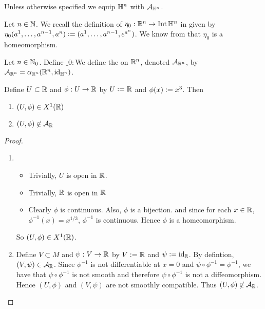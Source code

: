 \documentclass{book}
\begin{document}
	\begin{note}
		Unless otherwise specified we equip $\mathbb{H}^n$ with $\mathcal{A}_{\mathbb{H}^n}$.
	\end{note}

	\begin{note}
		Let $n \in \mathbb{N}$. We recall the definition of $\eta_0: \mathbb{R}^n \rightarrow \operatorname{Int} \mathbb{H}^n$ in  given by $\eta_0(a^1, \ldots, a^{n-1}, a^n) \vcentcolon= (a^1, \ldots, a^{n-1}, e^{a^n})$. We know from  that
		$\eta_0$ is a homeomorphism. 
	\end{note}

	\begin{defn}
		Let $n \in \mathbb{N}_0$. Define $\_0: $We define the  on $\mathbb{R}^n$, denoted $\mathcal{A}_{\mathbb{R}^n}$, by $\mathcal{A}_{\mathbb{R}^n} = \alpha_{\mathbb{R}^n}(\mathbb{R}^n, \operatorname{id}_{\mathbb{H}^n})$.  
	\end{defn}

	\begin{ex} 
		Define $U \subset \mathbb{R}$ and $\phi: U \rightarrow \mathbb{R}$ by $U \vcentcolon= \mathbb{R}$ and $\phi(x) \vcentcolon= x^3$. Then 
		\begin{enumerate}
			\item $(U, \phi) \in X^1(\mathbb{R})$ 
			\item $(U, \phi) \not \in \mathcal{A}_{\mathbb{R}}$
		\end{enumerate}
	\end{ex}

	\begin{proof}\
		\begin{enumerate}
			\item
			\begin{itemize}
				\item Trivially, $U$ is open in $\mathbb{R}$.
				\item Trivially, $\mathbb{R}$ is open in $\mathbb{R}$
				\item  Clearly $\phi$ is continuous. Also, $\phi$ is a bijection. and since for each $x \in \mathbb{R}$, $\phi^{-1}(x) = x^{1/3}$, $\phi^{-1}$ is continuous. Hence $\phi$ is a homeomorphism. 
			\end{itemize}
			So $(U, \phi) \in X^1(\mathbb{R})$.
			\item Define $V \subset M$ and $\psi: V \rightarrow \mathbb{R}$ by $V \vcentcolon= \mathbb{R}$ and $\psi \vcentcolon= \operatorname{id}_{\mathbb{R}}$. By defintion, $(V, \psi) \in \mathcal{A}_{\mathbb{R}}$. Since $\phi^{-1}$ is not differentiable at $x=0$ and $\psi \circ \phi^{-1} = \phi^{-1}$, we have that $\psi \circ \phi^{-1}$ is not smooth and therefore $\psi \circ \phi^{-1}$ is not a diffeomorphism. Hence $(U, \phi)$ and $(V, \psi)$ are not smoothly compatible. Thus $(U, \phi) \not \in \mathcal{A}_{\mathbb{R}}$. 
		\end{enumerate}
	\end{proof}
\end{document}

